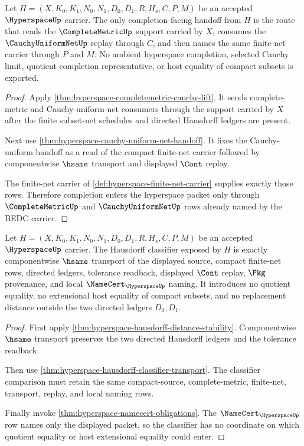 \begin{theorem}
\label{thm:hyperspace-cauchy-uniform-complete-handoff}
Let $H=(X,K_0,K_1,N_0,N_1,D_0,D_1,R,H_s,C,P,M)$ be an accepted $\HyperspaceUp$ carrier. The only completion-facing handoff from $H$ is the route that reads the $\CompleteMetricUp$ support carried by $X$, consumes the $\CauchyUniformNetUp$ replay through $C$, and then names the same finite-net carrier through $P$ and $M$. No ambient hyperspace completion, selected Cauchy limit, quotient completion representative, or host equality of compact subsets is exported.
\end{theorem}
\begin{proof}
Apply \autoref{thm:hyperspace-completemetric-cauchy-lift}. It sends complete-metric and Cauchy-uniform-net consumers through the support carried by $X$ after the finite subset-net schedules and directed Hausdorff ledgers are present.

Next use \autoref{thm:hyperspace-cauchy-uniform-net-handoff}. It fixes the Cauchy-uniform handoff as a read of the compact finite-net carrier followed by componentwise $\hsame$ transport and displayed $\Cont$ replay.

The finite-net carrier of \autoref{def:hyperspace-finite-net-carrier} supplies exactly those rows. Therefore completion enters the hyperspace packet only through $\CompleteMetricUp$ and $\CauchyUniformNetUp$ rows already named by the BEDC carrier.
\end{proof}

\begin{theorem}
\label{thm:hyperspace-hausdorff-classifier-exactness}
Let $H=(X,K_0,K_1,N_0,N_1,D_0,D_1,R,H_s,C,P,M)$ be an accepted $\HyperspaceUp$ carrier. The Hausdorff classifier exposed by $H$ is exactly componentwise $\hsame$ transport of the displayed source, compact finite-net rows, directed ledgers, tolerance readback, displayed $\Cont$ replay, $\Pkg$ provenance, and local $\NameCert_{\HyperspaceUp}$ naming. It introduces no quotient equality, no extensional host equality of compact subsets, and no replacement distance outside the two directed ledgers $D_0,D_1$.
\end{theorem}
\begin{proof}
First apply \autoref{thm:hyperspace-hausdorff-distance-stability}. Componentwise $\hsame$ transport preserves the two directed Hausdorff ledgers and the tolerance readback.

Then use \autoref{thm:hyperspace-hausdorff-classifier-transport}. The classifier comparison must retain the same compact-source, complete-metric, finite-net, transport, replay, and local naming rows.

Finally invoke \autoref{thm:hyperspace-namecert-obligations}. The $\NameCert_{\HyperspaceUp}$ row names only the displayed packet, so the classifier has no coordinate on which quotient equality or host extensional equality could enter.
\end{proof}

